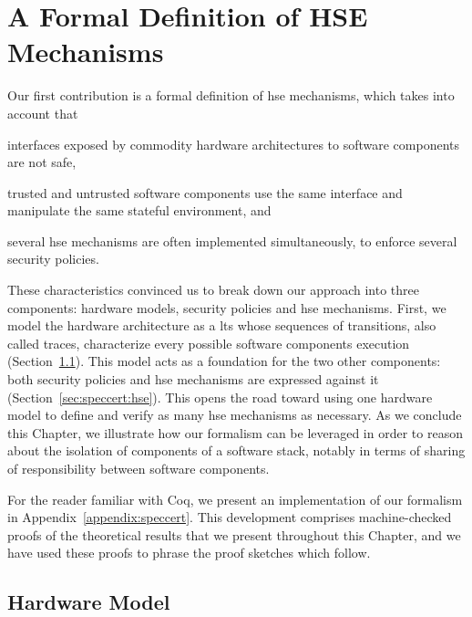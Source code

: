 \chapter{A Formal Definition of HSE Mechanisms}
\label{chapter:speccert}


\vspace{1cm}\noindent
%
Our first contribution is a formal definition of \ac{hse} mechanisms, which
takes into account that
%
\begin{inparaenum}[(1)]
\item interfaces exposed by commodity hardware architectures to software
  components are not safe,
\item trusted and untrusted software components use the same interface and
  manipulate the same stateful environment, and
\item several \ac{hse} mechanisms are often implemented simultaneously, to
  enforce several security policies.
\end{inparaenum}

These characteristics convinced us to break down our approach into three
components: hardware models, security policies and \ac{hse} mechanisms.
%
First, we model the hardware architecture as a \ac{lts} whose sequences of
transitions, also called traces, characterize every possible software components
execution (Section~\ref{subsec:speccert:hardware}).
%
This model acts as a foundation for the two other components: both security
policies and \ac{hse} mechanisms are expressed against it
(Section~\ref{sec:speccert:hse}).
%
This opens the road toward using one hardware model to define and verify as many
\ac{hse} mechanisms as necessary.
%
As we conclude this Chapter, we illustrate how our formalism can be leveraged in
order to reason about the isolation of components of a software stack, notably
in terms of sharing of responsibility between software components.

For the reader familiar with Coq, we present an implementation of our formalism
in Appendix~\ref{appendix:speccert}.
%
This development comprises machine-checked proofs of the theoretical results
that we present throughout this Chapter, and we have used these proofs to phrase
the proof sketches which follow.

\section{Hardware Model}
\label{subsec:speccert:hardware}

